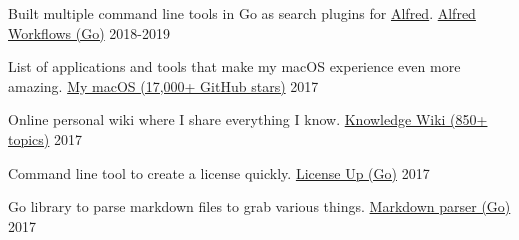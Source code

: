 
\begin{cventries}

  \cventry
    {Built multiple command line tools in Go as search plugins for \href{https://www.alfredapp.com}{Alfred}.}
    {\href{https://wiki.nikitavoloboev.xyz/sharing/my-github}{Alfred Workflows (Go)}}
    {}
    {2018-2019}
    {
    }

    \cventry
    {List of applications and tools that make my macOS experience even more amazing.}
    {\href{https://github.com/nikitavoloboev/my-mac-os}{My macOS (17,000+ GitHub stars)}}
    {}
    {2017}
    {
    }

    \cventry
    {Online personal wiki where I share everything I know.}
    {\href{https://wiki.nikitavoloboev.xyz}{Knowledge Wiki (850+ topics)}}
    {}
    {2017}
    {
    }

    \cventry
    {Command line tool to create a license quickly.}
    {\href{https://github.com/nikitavoloboev/license-up}{License Up (Go)}}
    {}
    {2017}
    {
    }

    \cventry
    {Go library to parse markdown files to grab various things.}
    {\href{https://github.com/nikitavoloboev/markdown-parser}{Markdown parser (Go)}}
    {}
    {2017}
    {
    }

\end{cventries}
